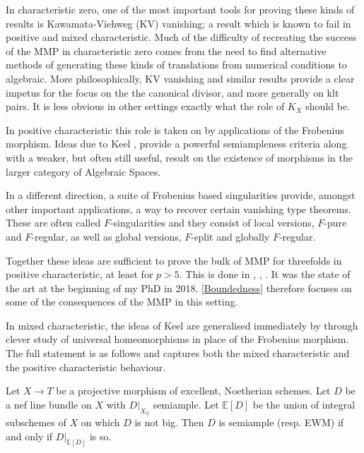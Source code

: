 \documentclass[a4paper,12pt]{book}
\begin{document}
	In characteristic zero, one of the most important tools for proving these kinds of results is Kawamata-Viehweg (KV) vanishing; a result which is known to fail in positive and mixed characteristic. Much of the difficulty of recreating the success of the MMP in characteristic zero comes from the need to find alternative methods of generating these kinds of translations from numerical conditions to algebraic. More philosophically, KV vanishing and similar results provide a clear impetus for the focus on the the canonical divisor, and more generally on klt pairs. It is less obvious in other settings exactly what the role of $K_{X}$ should be.
	
	In positive characteristic this role is taken on by applications of the Frobenius morphism. Ideas due to Keel \cite{Keel}, provide a powerful semiampleness criteria along with a weaker, but often still useful, result on the existence of morphisms in the larger category of Algebraic Spaces. 
	
	In a different direction, a suite of Frobenius based singularities provide, amongst other important applications, a way to recover certain vanishing type theorems. These are often called $F$-singularities and they consist of local versions, $F$-pure and $F$-regular, as well as global versions, $F$-split and globally $F$-regular.
		
	Together these ideas are sufficient to prove the bulk of MMP for threefolds in positive characteristic, at least for $p > 5$. This is done in \cite{HX15}, \cite{Bir16},  \cite{BW17}. It was the state of the art at the beginning of my PhD in 2018. \autoref{Boundedness} therefore focuses on some of the consequences of the MMP in this setting.
	
	In mixed characteristic, the ideas of Keel are generalised immediately by \cite{witaszek2020keels} through clever study of universal homeomorphisms in place of the Frobenius morphism. The full statement is as follows and captures both the mixed characteristic and the positive characteristic behaviour.
	
	\begin{theorem*}\cite[Theorem 1.2]{witaszek2020keels}
		Let $X \to T$ be a projective morphism of excellent, Noetherian schemes. Let $D$ be a nef line bundle on $X$ with $D|_{X_{\mathbb{Q}}}$ semiample. Let $\mathbb{E}[D]$ be the union of integral subschemes of $X$ on which $D$ is not big. Then $D$ is semiample (resp. EWM) if and only if $D|_{\mathbb{E}[D]}$ is so.
	\end{theorem*}
	
\end{document}
